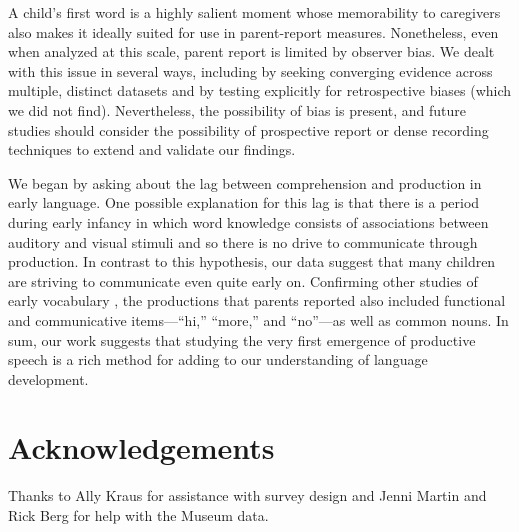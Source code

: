 \documentclass[10pt,letterpaper]{article}
\begin{document}
A child's first word is a highly salient moment whose memorability to caregivers also makes it ideally suited for use in parent-report measures. Nonetheless, even when analyzed at this scale, parent report is limited by observer bias. We dealt with this issue in several ways, including by seeking converging evidence across multiple, distinct datasets and by testing explicitly for retrospective biases (which we did not find). Nevertheless, the possibility of bias is present, and future studies should consider the possibility of prospective report or dense recording techniques to extend and validate our findings. 

We began by asking about the lag between comprehension and production in early language. One possible explanation for this lag is that there is a period during early infancy in which word knowledge consists of associations between auditory and visual stimuli and so there is no drive to communicate through production. In contrast to this hypothesis, our data suggest that many children are striving to communicate even quite early on. Confirming other studies of early vocabulary \cite{tardif2007}, the productions that parents reported also included functional and communicative items---``hi,'' ``more,'' and ``no''---as well as common nouns. In sum, our work suggests that studying the very first emergence of productive speech is a rich method for adding to our understanding of language development.

\section{Acknowledgements}

Thanks to Ally Kraus for assistance with survey design and Jenni Martin and Rick Berg for help with the Museum data.



\setlength{\bibleftmargin}{.125in}
\setlength{\bibindent}{-\bibleftmargin}


\end{document}
